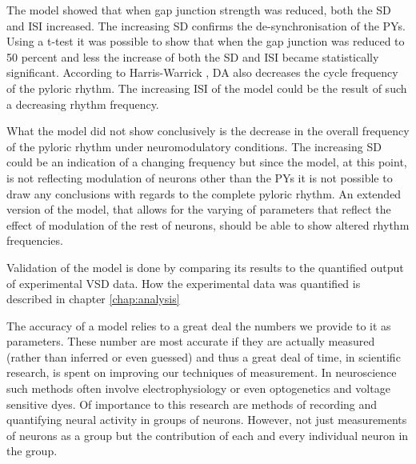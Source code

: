 The model showed that when gap junction strength was reduced, both the \ac{SD} and \ac{ISI} increased. The increasing \ac{SD} confirms the de-synchronisation of the \acp{PY}. Using a t-test it was possible to show that when the gap junction was reduced to 50 percent and less the increase of both the \ac{SD} and \ac{ISI} became statistically significant.  According to Harris-Warrick \cite{Harris-warrick1998}, \ac{DA} also decreases the cycle frequency of the pyloric rhythm. The increasing \ac{ISI} of the model could be the result of such a decreasing rhythm frequency.

What the model did not show conclusively is the decrease in the overall frequency of the pyloric rhythm under neuromodulatory conditions. The increasing \ac{SD} could be an indication of a changing frequency but since the model, at this point, is not reflecting modulation of neurons other than the \acp{PY} it is not possible to draw any conclusions with regards to the complete pyloric rhythm. An extended version of the model, that allows for the varying of parameters that reflect the effect of modulation of the rest of neurons, should be able to show altered rhythm frequencies.

Validation of the model is done by comparing its results to the quantified output of experimental \ac{VSD} data. How the experimental data was quantified is described in chapter \ref{chap:analysis}


The accuracy of a model relies to a great deal the numbers we provide to it as parameters. These number are most accurate if they are actually measured (rather than inferred or even guessed) and thus a great deal of time, in scientific research, is spent on improving our techniques of measurement. In neuroscience such methods often involve electrophysiology or even optogenetics and voltage sensitive dyes. Of importance to this research are methods of recording and quantifying neural activity in groups of neurons. However, not just measurements of neurons as a group but the contribution of each and every individual neuron in the group. 

